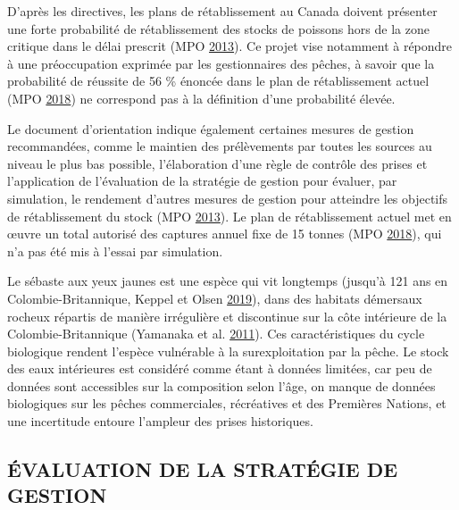 \documentclass[french,11pt]{book}
\begin{document}
D'après les directives, les plans de rétablissement au Canada doivent présenter une forte probabilité de rétablissement des stocks de poissons hors de la zone critique dans le délai prescrit (MPO \protect\hyperlink{ref-dfo2013}{2013}). Ce projet vise notamment à répondre à une préoccupation exprimée par les gestionnaires des pêches, à savoir que la probabilité de réussite de 56 \% énoncée dans le plan de rétablissement actuel (MPO \protect\hyperlink{ref-ifmp2018}{2018}) ne correspond pas à la définition d'une probabilité élevée.

Le document d'orientation indique également certaines mesures de gestion recommandées, comme le maintien des prélèvements par toutes les sources au niveau le plus bas possible, l'élaboration d'une règle de contrôle des prises et l'application de l'évaluation de la stratégie de gestion pour évaluer, par simulation, le rendement d'autres mesures de gestion pour atteindre les objectifs de rétablissement du stock (MPO \protect\hyperlink{ref-dfo2013}{2013}). Le plan de rétablissement actuel met en œuvre un total autorisé des captures annuel fixe de 15 tonnes (MPO \protect\hyperlink{ref-ifmp2018}{2018}), qui n'a pas été mis à l'essai par simulation.

Le sébaste aux yeux jaunes est une espèce qui vit longtemps (jusqu'à 121 ans en Colombie-Britannique, Keppel et Olsen \protect\hyperlink{ref-keppel2019}{2019}), dans des habitats démersaux rocheux répartis de manière irrégulière et discontinue sur la côte intérieure de la Colombie-Britannique (Yamanaka et al. \protect\hyperlink{ref-yamanaka2011}{2011}). Ces caractéristiques du cycle biologique rendent l'espèce vulnérable à la surexploitation par la pêche. Le stock des eaux intérieures est considéré comme étant à données limitées, car peu de données sont accessibles sur la composition selon l'âge, on manque de données biologiques sur les pêches commerciales, récréatives et des Premières Nations, et une incertitude entoure l'ampleur des prises historiques.

\hypertarget{sec:introduction-mse}{%
\subsection{ÉVALUATION DE LA STRATÉGIE DE GESTION}\label{sec:introduction-mse}}
\end{document}
